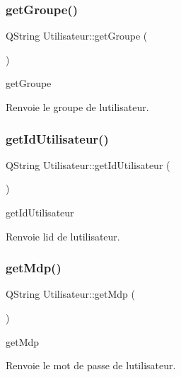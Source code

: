 \subsubsection{\texorpdfstring{get\+Groupe()}{getGroupe()}}
{\footnotesize\ttfamily Q\+String Utilisateur\+::get\+Groupe (\begin{DoxyParamCaption}{ }\end{DoxyParamCaption})}



get\+Groupe 

\begin{DoxyReturn}{Renvoie}
le groupe de l\textquotesingle{}utilisateur. 
\end{DoxyReturn}
\mbox{\label{class_utilisateur_ac86c327563c837920f2b12c482adffd9}} 
\subsubsection{\texorpdfstring{get\+Id\+Utilisateur()}{getIdUtilisateur()}}
{\footnotesize\ttfamily Q\+String Utilisateur\+::get\+Id\+Utilisateur (\begin{DoxyParamCaption}{ }\end{DoxyParamCaption})}



get\+Id\+Utilisateur 

\begin{DoxyReturn}{Renvoie}
l\textquotesingle{}id de l\textquotesingle{}utilisateur. 
\end{DoxyReturn}
\mbox{\label{class_utilisateur_a3d97468fbffac5a17f30a8f61ca9fa10}} 
\subsubsection{\texorpdfstring{get\+Mdp()}{getMdp()}}
{\footnotesize\ttfamily Q\+String Utilisateur\+::get\+Mdp (\begin{DoxyParamCaption}{ }\end{DoxyParamCaption})}



get\+Mdp 

\begin{DoxyReturn}{Renvoie}
le mot de passe de l\textquotesingle{}utilisateur. 
\end{DoxyReturn}
\mbox{\label{class_utilisateur_a84a4aa7b7f2fde194e9c706a8eb711e5}} 

